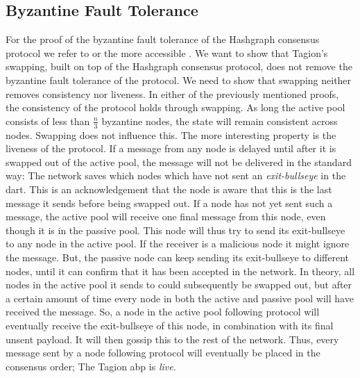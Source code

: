 \subsection{Byzantine Fault Tolerance}
    For the proof of the byzantine fault tolerance of the Hashgraph consensus protocol we refer to \cite{SWIRLDS_HASHGRAPH} or the more accessible \cite{mus_has}. We want to show that Tagion's swapping, built on top of the Hashgraph consensus protocol, does not remove the byzantine fault tolerance of the protocol. We need to show that swapping neither removes consistency nor \gls{liveness}. In either of the previously mentioned proofs, the consistency of the protocol holds through swapping. As long the active pool consists of less than $\frac{n}{3}$ byzantine nodes, the state will remain consistent across nodes. Swapping does not influence this. The more interesting property is the liveness of the protocol. If a message from any node is delayed until after it is swapped out of the active pool, the message will not be delivered in the standard way: The network saves which nodes which have not sent an \textit{exit-\gls{bullseye}} in the \gls{dart}. This is an acknowledgement that the node is aware that this is the last message it sends before being swapped out. If a node has not yet sent such a message, the active pool will receive one final message from this node, even though it is in the passive pool. This node will thus try to send its exit-\gls{bullseye} to any node in the active pool. If the receiver is a malicious node it might ignore the message. But, the passive node can keep sending its exit-\gls{bullseye} to different nodes, until it can confirm that it has been accepted in the network. In theory, all nodes in the active pool it sends to could subsequently be swapped out, but after a certain amount of time every node in both the active and passive pool will have received the message. So, a node in the active pool following protocol will eventually receive the exit-\gls{bullseye} of this node, in combination with its final unsent payload. It will then gossip this to the rest of the network. Thus, every message sent by a node following protocol will eventually be placed in the consensus order; The Tagion \gls{abp} is \textit{live}.
\pagebreak


